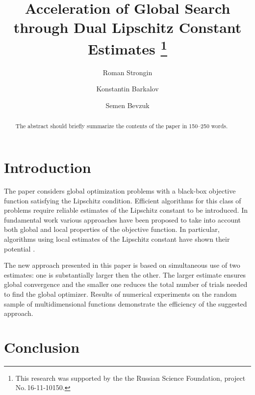 \documentclass[runningheads]{llncs}
\begin{document}
%
\title{Acceleration of Global Search through Dual Lipschitz Constant Estimates
\thanks{This research was supported by the the Russian Science Foundation, project No.\,16-11-10150.}}
%
%
\author{Roman Strongin%
\and Konstantin Barkalov%
\and Semen Bevzuk%
}
%
%
%
\maketitle              %
%
\begin{abstract}
The abstract should briefly summarize the contents of the paper in
150--250 words.

\end{abstract}
%
%
%
\section{Introduction}

The paper considers global optimization problems with a black-box objective function satisfying the Lipschitz condition. 
Efficient algorithms for this class of problems require reliable estimates of the Lipschitz constant to be introduced. 
In fundamental work \cite{Strongin2000} various approaches have been proposed to take into account both global and local properties of the objective function. 
In particular, algorithms using local estimates of the Lipschitz constant have shown their potential \cite{Sergeyev2010,Sergeyev2016}.

The new approach presented in this paper is based on simultaneous use of two estimates: one is substantially larger then the other. 
The larger estimate ensures global convergence and the smaller one reduces the total number of trials needed to find the global optimizer.
Results of numerical experiments on the random sample of multidimensional functions demonstrate the efficiency of the suggested approach.  

\section{Conclusion}

%
%




\end{document}
